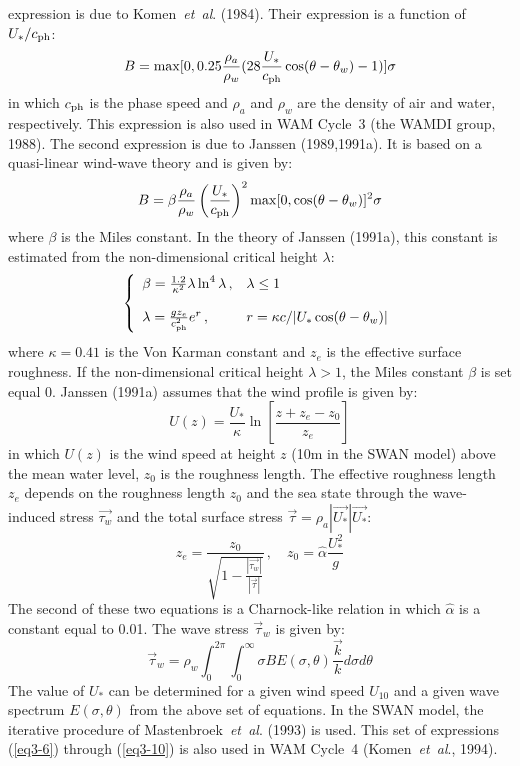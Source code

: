 \documentclass[12pt]{book}
\begin{document}
expression is due to Komen~{\it et~al}. (1984). Their expression is a function of $U_{*}/c_{\rm ph}$:
\begin{equation}
  B = \max [0, 0.25 \frac{\rho_a}{\rho_w} (28 \frac{U_*}{c_{\rm ph}}\cos(\theta-\theta_w) -1)]\sigma
  \label{eq3-5}
\end{equation}
in which $c _{\rm ph}$ is the phase speed and $\rho_a$ and $\rho_w$ are the density of air and water, respectively. This
expression is also used in WAM Cycle~3 (the WAMDI group, 1988). The second expression is due to Janssen (1989,1991a).
It is based on a quasi-linear wind-wave theory and is given by:
\begin{equation}
  B = \beta \frac{\rho_a}{\rho_w} \left(\frac{U_*}{c_{\rm ph}} \right)^2 \max[0,\cos(\theta-\theta_w)]^2\sigma
  \label{eq3-6}
\end{equation}
where $\beta$ is the Miles constant. In the theory of Janssen (1991a), this constant is estimated from
the non-dimensional critical height $\lambda$:
\begin{equation}
    \left\{
      \begin{array}{ll}
         \beta = \frac{1.2}{\kappa^2} \lambda \ln^4 \lambda \, , & \lambda \leq 1\\
         \\
         \lambda = \frac{g z_e}{c^2_{\rm ph}} e^r \, , & r = \kappa c/|U_* \cos(\theta-\theta_w)|
      \end{array}
    \right.
  \label{eq3-7}
\end{equation}
where $\kappa=0.41$ is the Von Karman constant and $z_e$ is the effective surface roughness.
If the non-dimensional critical height $\lambda>1$, the Miles constant $\beta$ is set equal 0.
Janssen (1991a) assumes that the wind profile is given by:
\begin{equation}
  U(z) = \frac{U_*}{\kappa} \ln [ \frac{z+z_e-z_0}{z_e} ]
  \label{eq3-8}
\end{equation}
in which $U(z)$ is the wind speed at height $z$ (10m in the SWAN model) above the mean water level, $z_0$ is
the roughness length. The effective roughness length $z_e$ depends on the roughness length $z_0$ and the sea
state through the wave-induced stress $\vec{\tau_w}$ and the total surface stress $\vec{\tau} = \rho_a |\vec{U_*}| \vec{U_*}$:
\begin{equation}
  z_e = \frac{z_0}{\sqrt{1 - \frac{|\vec{\tau_w}|}{|\vec{\tau}|}}}\, , \quad z_0 = \hat{\alpha} \frac{U_*^2}{g}
  \label{eq3-9}
\end{equation}
The second of these two equations is a Charnock-like relation in which $\hat{\alpha}$ is a constant equal to 0.01. The
wave stress $\vec{\tau}_w$ is given by:
\begin{equation}
  \vec{\tau}_w = \rho_w \int_{0}^{2\pi} \int_{0}^{\infty} \sigma B E (\sigma, \theta) \frac{\vec{k}}{k}
  d \sigma d \theta
  \label{eq3-10}
\end{equation}
The value of $U_*$ can be determined for a given wind speed $U_{10}$ and a given wave spectrum $E(\sigma,\theta)$ from the
above set of equations. In the SWAN model, the iterative procedure of Mastenbroek~{\it et~al}. (1993) is used.
This set of expressions (\ref{eq3-6}) through (\ref{eq3-10}) is also used in WAM Cycle~4 (Komen~{\it et~al}., 1994).
\end{document}
